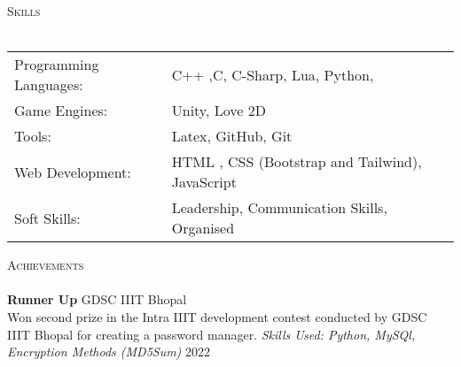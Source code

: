 \documentclass[a4paper]{article}
\newcommand{\lineunder} {
    \vspace*{-8pt} \\
    \hspace*{-18pt} \hrulefill \\
}
\newcommand{\header} [1] {
    {\hspace*{-18pt}\vspace*{6pt} \textsc{#1}}
    \vspace*{-6pt} \lineunder
}
\begin{document}
\header{Skills}
\vspace{2mm}
\begin{tabular}{ l l }
	Programming Languages: & C++ ,C, C-Sharp, Lua, Python, \\
	\vspace{1mm}
	Game Engines:        & Unity, Love 2D  \\
        Tools:        & Latex, GitHub, Git\\  
	Web Development:       & HTML , CSS (Bootstrap and Tailwind), JavaScript   \\
	Soft Skills:           &  Leadership, Communication Skills, Organised  \\
	
\end{tabular}

\vspace{2mm}
\header{Achievements}
\textbf{Runner Up} \hfill GDSC IIIT Bhopal\\
Won second prize in the Intra IIIT development contest conducted by GDSC IIIT Bhopal for creating a password manager.  
{\textit {Skills Used: Python, MySQl, Encryption Methods (MD5Sum)}}  \hfill 2022\\
\end{document}
